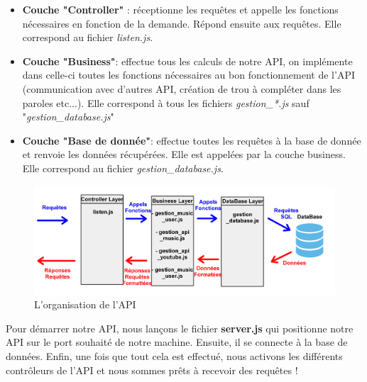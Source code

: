\documentclass[12pt,french]{article}
\begin{document}
\begin{itemize}
	\item \textbf{Couche "Controller"} : réceptionne les requêtes et appelle les fonctions nécessaires en fonction de la demande. Répond ensuite aux requêtes. Elle correspond au fichier \textit{listen.js}.
	\item \textbf{Couche "Business"}: effectue tous les calculs de notre \gls{API}, on implémente dans celle-ci toutes les fonctions nécessaires au bon fonctionnement de l'\gls{API} (communication avec d'autres \gls{API}, création de trou à compléter dans les paroles etc...). Elle correspond à tous les fichiers \textit{gestion\_*.js} sauf "\textit{gestion\_database.js}"
	\item \textbf{Couche "Base de donnée"}: effectue toutes les requêtes à la base de donnée et renvoie les données récupérées. Elle est appelées par la couche business. Elle correspond au fichier \textit{gestion\_database.js}.
	
\end{itemize}

\bigskip

\begin{figure}[H]
	\centering
	\includegraphics[scale=0.1]{api_couche.png}
	\caption{
	L'organisation de l'API}    
\end{figure}

\bigskip

Pour démarrer notre \gls{API}, nous lançons le fichier \textbf{server.js} qui positionne notre \gls{API} sur le port souhaité de notre machine. Ensuite, il se connecte à la base de données. Enfin, une fois que tout cela est effectué, nous activons les différents contrôleurs de l'\gls{API} et nous sommes prêts à recevoir des requêtes !
\end{document}
